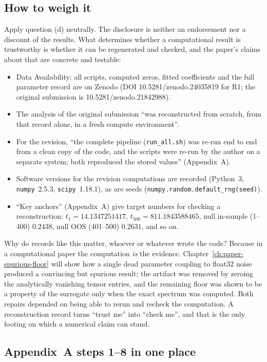 \subsection{How to weigh it}

Apply question (d) neutrally. The disclosure is neither an endorsement nor a discount of the results. What determines whether a computational result is trustworthy is whether it can be regenerated and checked, and the paper's claims about that are concrete and testable:
\begin{itemize}
\item Data Availability: all scripts, computed zeros, fitted coefficients and the full parameter record are on Zenodo (DOI 10.5281/zenodo.24035819 for R1; the original submission is 10.5281/zenodo.21842988).
\item The analysis of the original submission ``was reconstructed from scratch, from that record alone, in a fresh compute environment''.
\item For the revision, ``the complete pipeline (\texttt{run\_all.sh}) was re-run end to end from a clean copy of the code, and the scripts were re-run by the author on a separate system; both reproduced the stored values'' (Appendix~A).
\item Software versions for the revision computations are recorded (Python~3, \texttt{numpy}~2.5.3, \texttt{scipy}~1.18.1), as are seeds (\texttt{numpy.random.default\_rng(seed)}).
\item ``Key anchors'' (Appendix~A) give target numbers for checking a reconstruction: $t_1=14.1347251417$, $t_{500}=811.1843588465$, null in-sample (1--400) $0.2438$, null OOS (401--500) $0.2631$, and so on.
\end{itemize}

Why do records like this matter, whoever or whatever wrote the code? Because in a computational paper the computation \emph{is} the evidence. Chapter~\ref{ch:paper-spurious-floor} will show how a single dead parameter coupling to float32 noise produced a convincing but spurious result; the artifact was removed by zeroing the analytically vanishing tensor entries, and the remaining floor was shown to be a property of the surrogate only when the exact spectrum was computed. Both repairs depended on being able to rerun and recheck the computation. A reconstruction record turns ``trust me'' into ``check me'', and that is the only footing on which a numerical claim can stand.

\subsection{Appendix~A steps 1--8 in one place}

